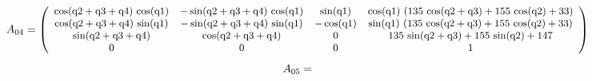 \documentclass[fleqn, a4paper, 5pt, russian]{article}
\begin{document}
\begin{landscape}
\begin{equation}
{}\end{equation}
\begin{equation}
\small{
	A_{04}=
	\left(\begin{array}{cccc} \cos\!\left(\mathrm{q2} + \mathrm{q3} + \mathrm{q4}\right)\, \cos\!\left(\mathrm{q1}\right) & - \sin\!\left(\mathrm{q2} + \mathrm{q3} + \mathrm{q4}\right)\, \cos\!\left(\mathrm{q1}\right) & \sin\!\left(\mathrm{q1}\right) & \cos\!\left(\mathrm{q1}\right)\, \left(135\, \cos\!\left(\mathrm{q2} + \mathrm{q3}\right) + 155\, \cos\!\left(\mathrm{q2}\right) + 33\right)\\ \cos\!\left(\mathrm{q2} + \mathrm{q3} + \mathrm{q4}\right)\, \sin\!\left(\mathrm{q1}\right) & - \sin\!\left(\mathrm{q2} + \mathrm{q3} + \mathrm{q4}\right)\, \sin\!\left(\mathrm{q1}\right) & - \cos\!\left(\mathrm{q1}\right) & \sin\!\left(\mathrm{q1}\right)\, \left(135\, \cos\!\left(\mathrm{q2} + \mathrm{q3}\right) + 155\, \cos\!\left(\mathrm{q2}\right) + 33\right)\\ \sin\!\left(\mathrm{q2} + \mathrm{q3} + \mathrm{q4}\right) & \cos\!\left(\mathrm{q2} + \mathrm{q3} + \mathrm{q4}\right) & 0 & 135\, \sin\!\left(\mathrm{q2} + \mathrm{q3}\right) + 155\, \sin\!\left(\mathrm{q2}\right) + 147\\ 0 & 0 & 0 & 1 \end{array}\right)
}\end{equation}
\begin{equation}
\small{
	A_{05}=
}
\end{equation}
\end{landscape}
\end{document}
